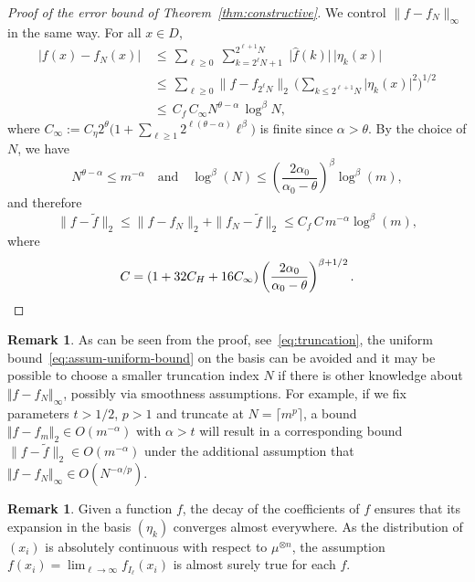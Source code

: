 \documentclass[a4paper,11pt]{article}
\renewcommand{\(}{\left (}
\renewcommand{\)}{\right )}
\newcommand{\<}{\langle}
\renewcommand{\>}{\rangle}
\theoremstyle{definition}
\newtheorem{remark}[theorem]{Remark}
\begin{document}
\begin{proof}[Proof of the error bound of Theorem~\ref{thm:constructive}]
We control $\|f-f_N\|_\infty$ in the same way.
For all $x\in D$,
\begin{align*}
    \vert f(x) - f_{N} (x) \vert
    \,&\leq\, 
    \sum_{\ell\geq 0} \;\sum_{k = 2^\ell N+1}^{2^{\ell+1}N} \;\vert\hat f(k)\vert \, \vert \eta_k(x) \vert\\
    \,&\leq\,
    \sum_{\ell\geq 0} \|f-f_{2^\ell N}\|_2\, \Big(\sum_{k \leq 2^{\ell+1}N} \vert \eta_k(x) \vert^2\Big)^{1/2}\\
    \,&\leq\,
    C_f\,C_\infty N^{\theta-\alpha} \, \log^\beta N,
\end{align*}
where
$
C_\infty:=C_\eta 2^\theta\Big(1+\sum_{\ell\geq 1}2^{\ell(\theta-\alpha)}\ell^{\beta}\Big)
$
is finite since $\alpha>\theta$. By the choice of $N$, we have
\[
N^{\theta-\alpha}\leq m^{-\alpha}\quad\text{and}\quad \log^\beta(N)\leq 
\left(\frac{2\alpha_0}{\alpha_0-\theta}\right)^\beta 
\log^\beta(m),
\]
and therefore
\[
\|f-\tilde f\|_2\leq \|f-f_N\|_2+\|f_N-\tilde f\|_2\leq  C_f\,C\,m^{-\alpha}\log^\beta(m),
\]
where
\[
C=(1+32 C_H+16C_\infty)\left(\frac{2\alpha_0}{\alpha_0-\theta}\right)^{\beta+1/2}.\qedhere
\]
\end{proof}

\begin{remark}
\label{rem:uniform-decay}
    As can be seen from
    the proof, see~\eqref{eq:truncation}, the uniform bound~\eqref{eq:assum-uniform-bound} on the basis can be avoided and it may be possible to choose a smaller truncation index $N$ if there is other knowledge about $\Vert f - f_{N} \Vert_\infty$,
    possibly via smoothness assumptions.
    For example, if we fix parameters $t>1/2$, $p>1$ and truncate at $N = \lceil m^p \rceil$, a bound $\Vert f - f_m \Vert_2 \in O(m^{-\alpha})$ with $\alpha >t$ will result in a corresponding bound $\|f-\tilde f\|_2 \in O(m^{-\alpha})$ under the additional assumption that $\Vert f - f_{N} \Vert_\infty \in O(N^{-\alpha/p})$.
\end{remark}


 \begin{remark}
 Given a function $f$, the decay of the coefficients of $f$ ensures that its expansion in the basis $(\eta_k)$ converges almost everywhere. As the distribution of $(x_i)$ is absolutely continuous with respect to $\mu^{\otimes n}$, the assumption $f(x_i)=\lim_{\ell\to\infty}f_{I_\ell}(x_i)$ is almost surely true for each $f$.
 \end{remark}
\end{document}
